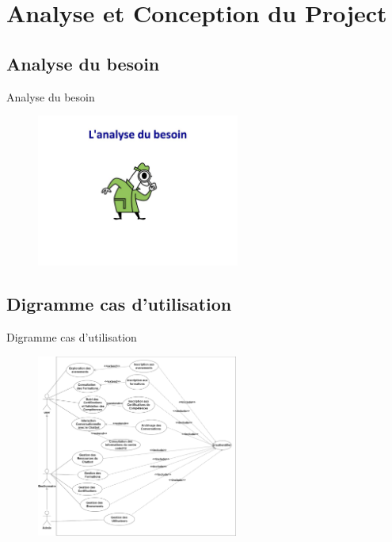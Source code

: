 \documentclass[aspectratio=169]{beamer}
\begin{document}
\section{Analyse et Conception du Project}
\subsection{Analyse du besoin}
\begin{frame}{Analyse du besoin}
\begin{figure}[htpb]
        \centering
        \includegraphics[height=5cm]{pic/analyse-besoin.jpg}
    \end{figure}

\end{frame}

\subsection{Digramme cas d'utilisation}
\begin{frame}{Digramme cas d'utilisation}
 \begin{figure}[htpb]
        \centering
        \includegraphics[height=6cm]{pic/usecase.png}
    \end{figure}
\end{frame}
\end{document}
